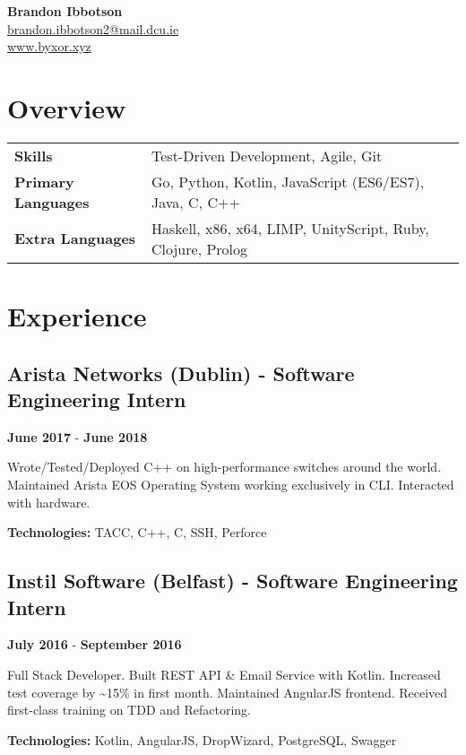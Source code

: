 \documentclass{article}
\newcommand{\youremail}[1]{\href{mailto:#1}{#1}}
\newcommand{\yourtitle}[3]{
  \begin{center}
    {\huge\bfseries #1}\\
    \vspace{.5em}
    \youremail{#2}\\
    \url{#3}\\
    \vspace{.7em}
  \end{center}
}
\begin{document}
\yourtitle{Brandon Ibbotson}{brandon.ibbotson2@mail.dcu.ie}{www.byxor.xyz}
\section{Overview}
\begin{tabularx}{\textwidth}{ll}
\vspace{1em}
\textbf{Skills} & Test-Driven Development, Agile, Git\\
\vspace{1em}
\textbf{Primary Languages} & Go, Python, Kotlin, JavaScript (ES6/ES7), Java, C, C++\\
\textbf{Extra Languages} & Haskell, x86, x64, LIMP, UnityScript, Ruby, Clojure, Prolog\\
\end{tabularx}
\section{Experience}
\subsection{Arista Networks (Dublin) - Software Engineering Intern}
\textbf{June 2017} - \textbf{June 2018}

Wrote/Tested/Deployed C++ on high-performance switches around the world. Maintained Arista EOS Operating System working exclusively in CLI. Interacted with hardware.

\textbf{Technologies: }TACC, C++, C, SSH, Perforce
\vspace{0.5em}\subsection{Instil Software (Belfast) - Software Engineering Intern}
\textbf{July 2016} - \textbf{September 2016}

Full Stack Developer. Built REST API \& Email Service with Kotlin. Increased test coverage by \textasciitilde{}15\% in first month. Maintained AngularJS frontend. Received first-class training on TDD and Refactoring.

\textbf{Technologies: }Kotlin, AngularJS, DropWizard, PostgreSQL, Swagger
\vspace{0.5em}
\end{document}
